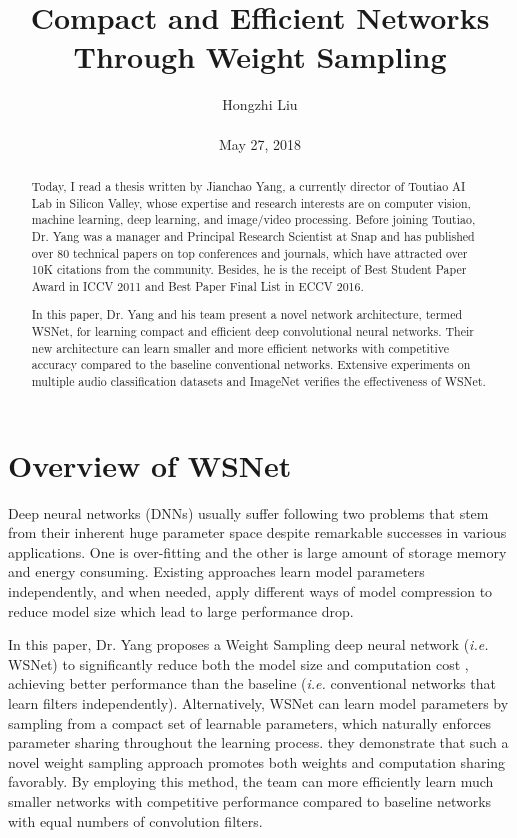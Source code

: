 \documentclass[10pt,twocolumn,letterpaper]{article}
\title{Compact and Efficient Networks Through Weight Sampling}
\author{Hongzhi Liu\\\\
May 27, 2018}
\begin{document}
\maketitle
\begin{abstract}
	Today, I read a thesis written by Jianchao Yang, a currently director of Toutiao AI Lab in Silicon Valley, whose expertise and research interests are on computer vision, machine learning, deep learning, and image/video processing. Before joining Toutiao, Dr. Yang was a manager and Principal Research Scientist at Snap and has published over 80 technical papers on top conferences and journals, which have attracted over 10K citations from the community. Besides, he is the receipt of Best Student Paper Award in ICCV 2011 and Best Paper Final List in ECCV 2016.
	
	In this paper, Dr. Yang and his team present a novel network architecture, termed WSNet, for learning compact and efficient deep convolutional neural networks. Their new architecture can learn smaller and more efficient networks with competitive accuracy compared to the baseline conventional networks. Extensive experiments on multiple audio classification datasets and ImageNet verifies the effectiveness of WSNet. 
\end{abstract}
\section{Overview of WSNet}

Deep neural networks (DNNs) usually suffer following two problems that stem from their inherent huge parameter space despite remarkable successes in various applications. One is over-fitting and the other is large amount of storage memory and energy consuming. Existing approaches learn model parameters independently, and when needed, apply different ways of model compression to reduce model size which lead to large performance drop.

In this paper, Dr. Yang proposes a Weight Sampling deep neural network (\emph{i.e.} WSNet) to significantly reduce both the model size and computation cost \cite{DBLP:journals/corr/abs-1711-10067}, achieving better performance than the baseline (\emph{i.e.} conventional networks that learn filters independently). Alternatively, WSNet can learn model parameters by sampling from a compact set of learnable parameters, which naturally enforces parameter sharing throughout the learning process. they demonstrate that such a novel weight sampling approach promotes both weights and computation sharing favorably. By employing this method, the team can more efficiently learn much smaller networks with competitive performance compared to baseline networks with equal numbers of convolution filters.
\end{document}
